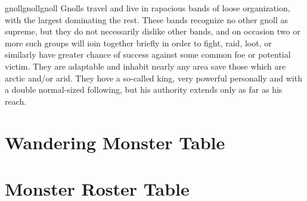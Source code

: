 \documentclass[a4paper,sansserif,1e]{rpg-module}
\begin{document}
\begin{newmonster3}{gnoll}{gnoll}{gnoll}
Gnolls travel and live in rapacious bands of loose organization, with the
largest dominating the rest. These bands recognize no other gnoll as
supreme, but they do not necessarily dislike other bands, and on occasion
two or more such groups will ioin together briefly in order to fight, raid,
loot, or similarly have greater chance of success against some common foe
or potential victim. They are adaptable and inhabit nearly any area save
those which are arctic and/or arid. They hove a so-called king, very
powerful personally and with a double normal-sized following, but his
authority extends only as far as his reach.
\end{newmonster3}

\onecolumn

\section{Wandering Monster Table}

\begin{wanderingmonsters}[b]
\end{wanderingmonsters}

\section{Monster Roster Table}

\begin{monsterroster}
\end{monsterroster}
\end{document}
